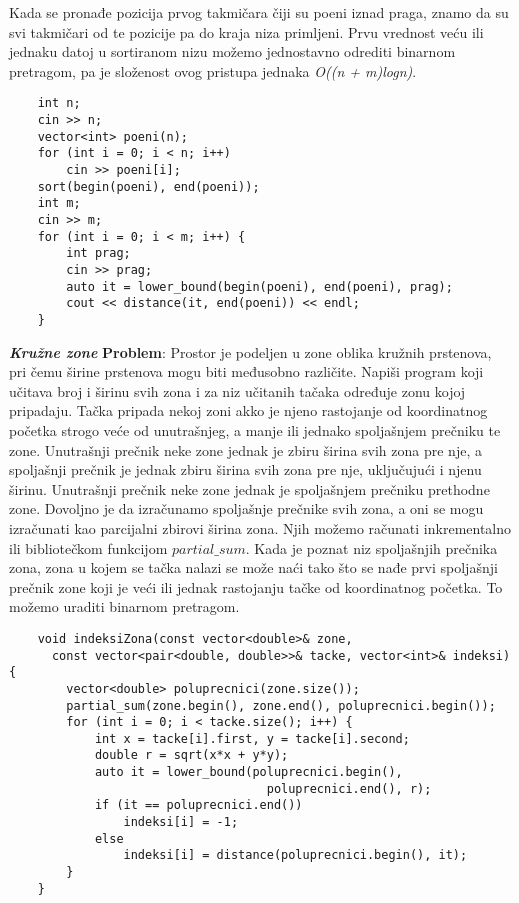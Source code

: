 \documentclass{article}
\begin{document}
Kada se pronađe pozicija prvog takmičara čiji su poeni iznad praga, znamo da
su svi takmičari od te pozicije pa do kraja niza primljeni. Prvu vrednost veću ili jednaku datoj u sortiranom nizu možemo
jednostavno odrediti binarnom pretragom, pa je složenost ovog pristupa jednaka \textit{O((n + m)logn)}.
\begin{lstlisting}
    int n;
    cin >> n;
    vector<int> poeni(n);
    for (int i = 0; i < n; i++)
        cin >> poeni[i];
    sort(begin(poeni), end(poeni));
    int m;
    cin >> m;
    for (int i = 0; i < m; i++) {
        int prag;
        cin >> prag;
        auto it = lower_bound(begin(poeni), end(poeni), prag);
        cout << distance(it, end(poeni)) << endl;
    }
\end{lstlisting}
\vspace{0.1cm}
\textit{\textbf{Kružne zone}}
\vspace{0.2cm}\newline
\textbf{Problem}: Prostor je
podeljen u zone oblika kružnih prstenova, pri čemu širine prstenova mogu biti
međusobno različite. Napiši program koji učitava broj i širinu svih zona i za niz
učitanih tačaka određuje zonu kojoj pripadaju.
\newline
Tačka pripada nekoj zoni akko je njeno rastojanje od koordinatnog
početka strogo veće
od unutrašnjeg, a manje ili jednako spoljašnjem prečniku te zone. Unutrašnji
prečnik neke zone jednak je zbiru širina svih zona pre nje, a spoljašnji prečnik je jednak zbiru širina svih zona pre nje, uključujući i
njenu širinu. Unutrašnji prečnik neke zone jednak je spoljašnjem
prečniku prethodne zone. Dovoljno je da izračunamo spoljašnje prečnike svih zona, a oni se mogu izračunati kao parcijalni zbirovi širina zona.
Njih možemo računati inkrementalno ili bibliotečkom funkcijom
$partial\_sum$. Kada je poznat niz spoljašnjih prečnika zona, zona u kojem
se tačka nalazi se može naći tako što se nađe prvi spoljašnji prečnik zone
koji je veći ili jednak rastojanju tačke od koordinatnog početka. To možemo
uraditi binarnom pretragom.
\newpage
\begin{lstlisting}
    void indeksiZona(const vector<double>& zone, 
      const vector<pair<double, double>>& tacke, vector<int>& indeksi) {
        vector<double> poluprecnici(zone.size());
        partial_sum(zone.begin(), zone.end(), poluprecnici.begin());
        for (int i = 0; i < tacke.size(); i++) {
            int x = tacke[i].first, y = tacke[i].second;
            double r = sqrt(x*x + y*y);
            auto it = lower_bound(poluprecnici.begin(), 
                                    poluprecnici.end(), r);
            if (it == poluprecnici.end())
                indeksi[i] = -1;
            else
                indeksi[i] = distance(poluprecnici.begin(), it);
        }
    }
\end{lstlisting}
\end{document}

